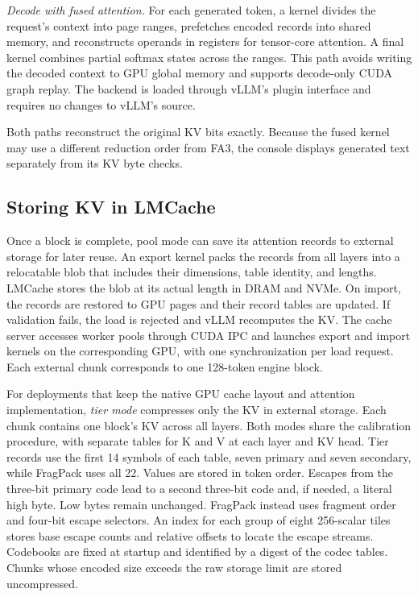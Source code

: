 \documentclass[conference]{IEEEtran}
\begin{document}
\emph{Decode with fused attention.} For each generated token, a kernel divides
the request's context into page ranges, prefetches encoded records into
shared memory, and reconstructs operands in registers for tensor-core
attention. A final kernel combines partial softmax states across the
ranges. This path avoids writing the decoded context to GPU global memory
and supports decode-only CUDA graph replay. The backend is loaded through
vLLM's plugin interface and requires no changes to vLLM's source.

Both paths reconstruct the original KV bits exactly. Because the fused
kernel may use a different reduction order from FA3, the console displays
generated text separately from its KV byte checks.

\subsection{Storing KV in LMCache}
Once a block is complete, pool mode can save its attention records to
external storage for later reuse. An export kernel packs the records from
all layers into a relocatable blob that includes their dimensions, table
identity, and lengths. LMCache stores the blob at its actual length in
DRAM and NVMe. On import, the records are restored to GPU pages and their
record tables are updated. If validation fails, the load is rejected and
vLLM recomputes the KV. The cache server accesses worker pools through CUDA
IPC and launches export and import kernels on the corresponding GPU, with
one synchronization per load request. Each external chunk corresponds to
one 128-token engine block.

For deployments that keep the native GPU cache layout and attention
implementation, \emph{tier mode} compresses only the KV in external storage.
Each chunk contains one block's KV across all layers. Both modes share the
calibration procedure, with separate tables for K and V at each layer and
KV head. Tier records use the first 14 symbols of each table, seven primary
and seven secondary, while FragPack uses all 22. Values are stored in token
order. Escapes from the three-bit primary code lead to a second three-bit
code and, if needed, a literal high byte. Low bytes remain unchanged.
FragPack instead uses fragment order and four-bit escape selectors.
An index for each group of eight 256-scalar tiles stores base escape
counts and relative offsets to locate the escape streams. Codebooks are
fixed at startup and identified by a digest of the codec tables. Chunks
whose encoded size exceeds the raw storage limit are stored uncompressed.
\end{document}
